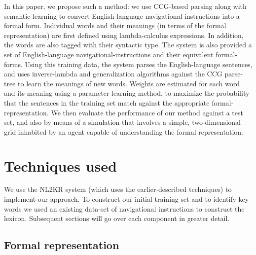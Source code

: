 \documentclass[11pt,letterpaper]{article}
\begin{document}
In this paper, we propose such a method: we use CCG-based parsing along with semantic learning to convert English-language navigational-instructions into a formal form. Individual words and their meanings (in terms of the formal representation) are first defined using lambda-calculus expressions. In addition, the words are also tagged with their syntactic type. The system is also provided a set of English-language navigational-instructions and their equivalent formal-forms. Using this training data, the system parses the English-language sentences, and uses inverse-lambda and generalization algorithms against the CCG parse-tree to learn the meanings of new words. Weights are estimated for each word and its meaning using a parameter-learning method, to maximize the probability that the sentences in the training set match against the appropriate formal-representation. We then evaluate the performance of our method against a test set, and also by means of a simulation that involves a simple, two-dimensional grid inhabited by an agent capable of understanding the formal representation.

\section{Techniques used}

We use the NL2KR\cite{baral2013nl2kr} system (which uses the earlier-described techniques) to implement our approach. To construct our initial training set and to identify key-words we used an existing data-set of navigational instructions\cite{chen2011learning} to construct the lexicon. Subsequent sections will go over each component in greater detail.

\subsection{Formal representation}
\end{document}

